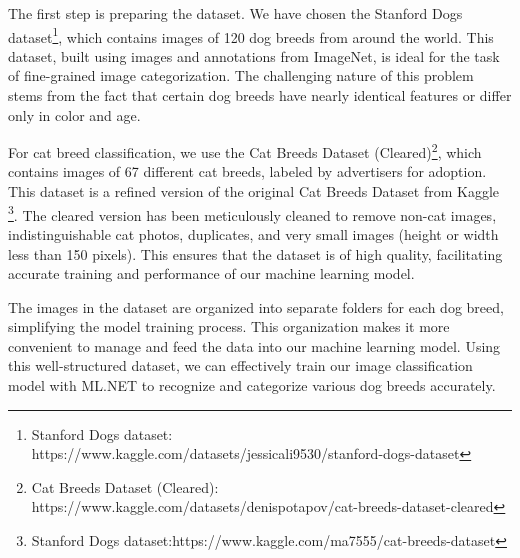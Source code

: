 The first step is preparing the dataset. We have chosen the Stanford Dogs dataset\footnote{Stanford Dogs dataset: https://www.kaggle.com/datasets/jessicali9530/stanford-dogs-dataset}, which contains images of 120 dog breeds from around 
the world. This dataset, built using images and annotations from ImageNet, is ideal for the task of fine-grained image categorization. 
The challenging nature of this problem stems from the fact that certain dog breeds have nearly identical features or differ only in color and age.

For cat breed classification, we use the Cat Breeds Dataset (Cleared)\footnote{Cat Breeds Dataset (Cleared): https://www.kaggle.com/datasets/denispotapov/cat-breeds-dataset-cleared}, which contains images of 67 different cat breeds, labeled by advertisers for 
adoption. This dataset is a refined version of the original Cat Breeds Dataset from Kaggle \footnote{Stanford Dogs dataset:https://www.kaggle.com/ma7555/cat-breeds-dataset}. 
The cleared version has been meticulously cleaned to remove non-cat images, indistinguishable cat photos, duplicates, and very small images 
(height or width less than 150 pixels). This ensures that the dataset is of high quality, facilitating accurate training and performance of our 
machine learning model.

The images in the dataset are organized into separate folders for each dog breed, simplifying the model training process. This organization 
makes it more convenient to manage and feed the data into our machine learning model. Using this well-structured dataset, we can effectively 
train our image classification model with ML.NET to recognize and categorize various dog breeds accurately.

